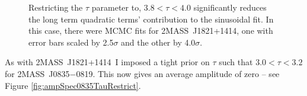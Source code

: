 \documentclass[twocolumn]{aastex6}
\newcommand{\sha}{2MASS~J0835$-$0819}
\newcommand{\shb}{2MASS~J1821+1414}
\begin{document}
\begin{figure}[!t]
\centering
{}
	\caption{Restricting the $\tau$ parameter to, $3.8 < \tau < 4.0$ significantly reduces the long term quadratic terms' contribution to the sinusoidal fit. In this case, there were MCMC fits for \shb, one with error bars scaled by 2.5$\sigma$ and the other by 4.0$\sigma$.}
	\label{fig:ampSpecManualSTauRestrict}
	\vspace{0.1in}
\end{figure} 

As with \shb\ I imposed a tight prior on $\tau$ such that $3.0 < \tau < 3.2$ for \sha. This now gives an average amplitude of zero -- see Figure \ref{fig:ampSpec0835TauRestrict}.
\end{document}
